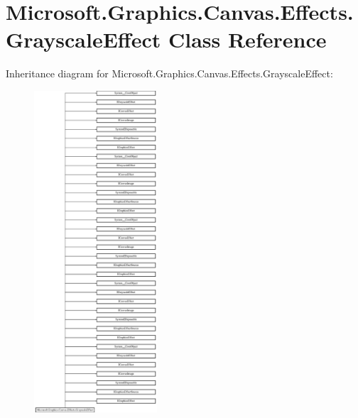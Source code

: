 \hypertarget{class_microsoft_1_1_graphics_1_1_canvas_1_1_effects_1_1_grayscale_effect}{}\section{Microsoft.\+Graphics.\+Canvas.\+Effects.\+Grayscale\+Effect Class Reference}
\label{class_microsoft_1_1_graphics_1_1_canvas_1_1_effects_1_1_grayscale_effect}
Inheritance diagram for Microsoft.\+Graphics.\+Canvas.\+Effects.\+Grayscale\+Effect\+:\begin{figure}[H]
\begin{center}
\leavevmode
\includegraphics[height=12.000000cm]{class_microsoft_1_1_graphics_1_1_canvas_1_1_effects_1_1_grayscale_effect}
\end{center}
\end{figure}
